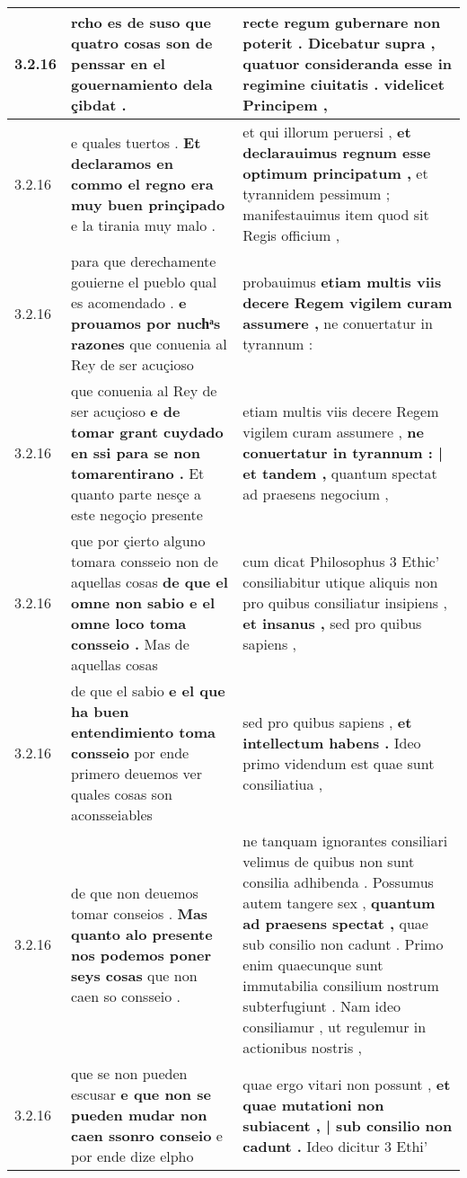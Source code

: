 \begin{tabular}{|p{1cm}|p{6.5cm}|p{6.5cm}|}
3.2.16 & rcho es de suso \textbf{ que quatro cosas son de penssar } en el gouernamiento dela çibdat . & recte regum gubernare non poterit . \textbf{ Dicebatur supra , quatuor consideranda esse in regimine ciuitatis . } videlicet Principem , \\\hline
3.2.16 & e quales tuertos . \textbf{ Et declaramos en commo el regno era muy buen prinçipado } e la tirania muy malo . & et qui illorum peruersi , \textbf{ et declarauimus regnum esse optimum principatum , } et tyrannidem pessimum ; manifestauimus item quod sit Regis officium , \\\hline
3.2.16 & para que derechamente gouierne el pueblo qual es acomendado . \textbf{ e prouamos por nuchͣs razones } que conuenia al Rey de ser acuçioso & probauimus \textbf{ etiam multis viis decere Regem vigilem curam assumere , } ne conuertatur in tyrannum : \\\hline
3.2.16 & que conuenia al Rey de ser acuçioso \textbf{ e de tomar grant cuydado en ssi para se non tomarentirano . } Et quanto parte nesçe a este negoçio presente & etiam multis viis decere Regem vigilem curam assumere , \textbf{ ne conuertatur in tyrannum : | et tandem , } quantum spectat ad praesens negocium , \\\hline
3.2.16 & que por çierto alguno tomara consseio non de aquellas cosas \textbf{ de que el omne non sabio e el omne loco toma consseio . } Mas de aquellas cosas & cum dicat Philosophus 3 Ethic’ consiliabitur utique aliquis non pro quibus consiliatur insipiens , \textbf{ et insanus , } sed pro quibus sapiens , \\\hline
3.2.16 & de que el sabio \textbf{ e el que ha buen entendimiento toma consseio } por ende primero deuemos ver quales cosas son aconsseiables & sed pro quibus sapiens , \textbf{ et intellectum habens . } Ideo primo videndum est quae sunt consiliatiua , \\\hline
3.2.16 & de que non deuemos tomar conseios . \textbf{ Mas quanto alo presente nos podemos poner seys cosas } que non caen so consseio . & ne tanquam ignorantes consiliari velimus de quibus non sunt consilia adhibenda . Possumus autem tangere sex , \textbf{ quantum ad praesens spectat , } quae sub consilio non cadunt . Primo enim quaecunque sunt immutabilia consilium nostrum subterfugiunt . Nam ideo consiliamur , ut regulemur in actionibus nostris , \\\hline
3.2.16 & que se non pueden escusar \textbf{ e que non se pueden mudar non caen ssonro conseio } e por ende dize elpho & quae ergo vitari non possunt , \textbf{ et quae mutationi non subiacent , | sub consilio non cadunt . } Ideo dicitur 3 Ethi’ \\\hline

\end{tabular}
